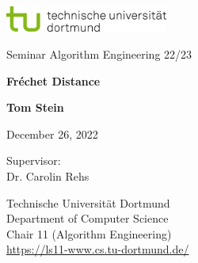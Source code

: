\begin{titlepage}
    \includegraphics[width=0.4\textwidth]{images/tud_logo_rgb.jpg}

    \begin{center}
        \vspace{3.5cm} \LARGE Seminar Algorithm Engineering 22/23

        \vspace{0.5cm} \huge \textbf{Fréchet Distance}

        \vspace{5cm} \textbf{Tom Stein}

        \vspace{0.25cm} \Large December 26, 2022
    \end{center}

    \vspace{5.2cm} \large \noindent Supervisor: \\
    Dr. Carolin Rehs
    
    \vspace{1cm} \noindent Technische Universität Dortmund \\
    Department of Computer Science \\
    Chair 11 (Algorithm Engineering) \\ 
    \url{https://ls11-www.cs.tu-dortmund.de/}

    
\end{titlepage}
